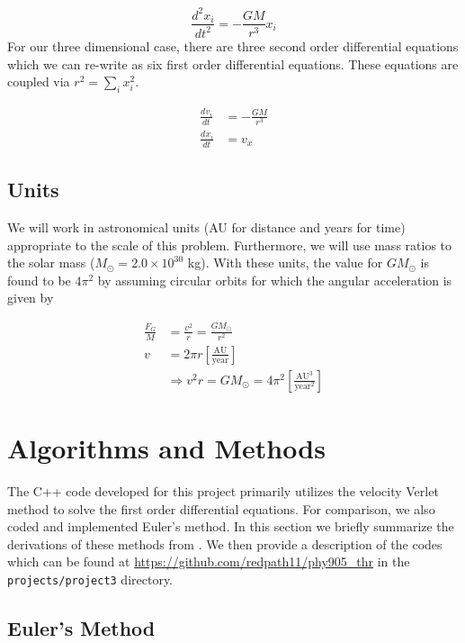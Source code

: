 \documentclass[10pt,showpacs,preprintnumbers,footinbib,amsmath,amssymb,aps,prl,twocolumn,groupedaddress,superscriptaddress,showkeys]{revtex4-1}
\newcommand{\pwrten}[1]{%
	\ensuremath{10^{#1}} }
\newcommand{\deriv}[3][]{%
	\ensuremath{ \frac{d ^{#1} {#2}}{d {#3}^{#1}}}}
\begin{document}
\begin{equation*}
	\deriv[2]{x_i}{t} = - \frac{GM}{r^3} x_i
\end{equation*}
For our three dimensional case, there are three second order differential
equations which we can re-write as six first order differential equations.
These equations are coupled via $r^2 = \sum_i x_{i}^{2}$.

\begin{align*}
	\deriv[]{v_i}{t} &= - \frac{GM}{r^3}\\
	\deriv[]{x_i}{t} &= v_x
\end{align*}

\subsection*{Units}

We will work in astronomical units (AU for distance and years for time)
appropriate to the scale of this problem. Furthermore, we will use
mass ratios to the solar mass ($M _{\odot} = 2.0 \times \pwrten{30}$ kg).
With these units, the value for $GM_{\odot}$ is found to be $4\pi^2$ by
assuming circular orbits for which the angular acceleration is given by

\begin{align*}
	\frac{F_G}{M} &= \frac{v^2}{r} = \frac{G M_{\odot}}{r^2}\\
	v &= 2 \pi r \left [ \frac{\mathrm{AU}}{\mathrm{year}} \right ]\\
	& \Rightarrow v^2 r = GM_{\odot} = 4 \pi ^2 \left [ 
\frac{\mathrm{AU}^3}{\mathrm{year}^2} \right ]
\end{align*}

\section*{Algorithms and Methods}

The C++ code developed for this project primarily utilizes the velocity
Verlet method to solve the first order differential equations. For comparison,
we also coded and implemented Euler's method. In this section we briefly
summarize the derivations of these methods from \citet{Morten}. We
then provide a description of the codes which can be
found at \url{https://github.com/redpath11/phy905_thr} in the
\texttt{projects/project3} directory.

\subsection*{Euler's Method}
\end{document}

